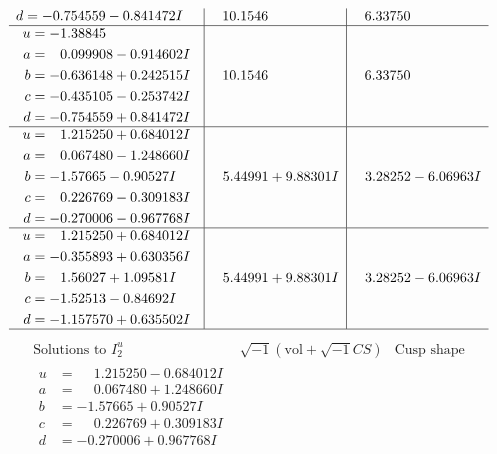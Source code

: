 \documentclass[1p]{elsarticle_modified}
\theoremstyle{definition}
\newcommand{\I}{\sqrt{-1}}
\begin{document}
$$\begin{array}{c|c|c}
\begin{aligned}
d &= -0.754559 - 0.841472 I\end{aligned}
 & \phantom{-}10.1546\phantom{ +0.000000I} & \phantom{-}6.33750\phantom{ +0.000000I} \\ \hline\begin{aligned}
u &= -1.38845\phantom{ +0.000000I} \\
a &= \phantom{-}0.099908 - 0.914602 I \\
b &= -0.636148 + 0.242515 I \\
c &= -0.435105 - 0.253742 I \\
d &= -0.754559 + 0.841472 I\end{aligned}
 & \phantom{-}10.1546\phantom{ +0.000000I} & \phantom{-}6.33750\phantom{ +0.000000I} \\ \hline\begin{aligned}
u &= \phantom{-}1.215250 + 0.684012 I \\
a &= \phantom{-}0.067480 - 1.248660 I \\
b &= -1.57665 - 0.90527 I \\
c &= \phantom{-}0.226769 - 0.309183 I \\
d &= -0.270006 - 0.967768 I\end{aligned}
 & \phantom{-}5.44991 + 9.88301 I & \phantom{-}3.28252 - 6.06963 I \\ \hline\begin{aligned}
u &= \phantom{-}1.215250 + 0.684012 I \\
a &= -0.355893 + 0.630356 I \\
b &= \phantom{-}1.56027 + 1.09581 I \\
c &= -1.52513 - 0.84692 I \\
d &= -1.157570 + 0.635502 I\end{aligned}
 & \phantom{-}5.44991 + 9.88301 I & \phantom{-}3.28252 - 6.06963 I\\
 \hline 
 \end{array}$$\newpage$$\begin{array}{c|c|c}  
\text{Solutions to }I^u_{2}& \I (\text{vol} + \sqrt{-1}CS) & \text{Cusp shape}\\
 \hline 
\begin{aligned}
u &= \phantom{-}1.215250 - 0.684012 I \\
a &= \phantom{-}0.067480 + 1.248660 I \\
b &= -1.57665 + 0.90527 I \\
c &= \phantom{-}0.226769 + 0.309183 I \\
d &= -0.270006 + 0.967768 I\end{aligned}

\end{array}$$
\end{document}
